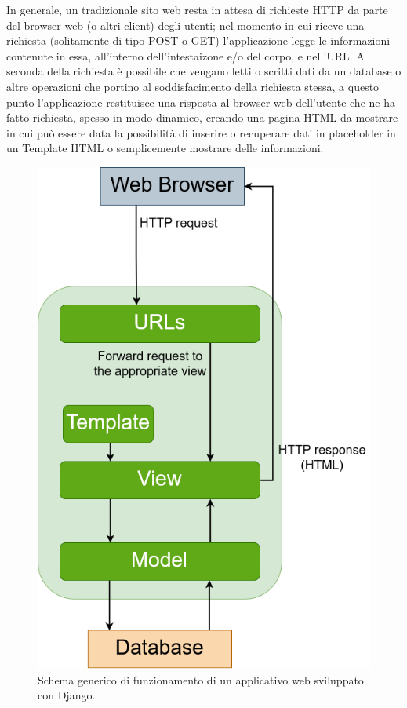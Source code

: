 In generale, un tradizionale sito web resta in attesa di richieste HTTP da parte del browser web (o altri client) degli utenti; nel momento in cui riceve 
una richiesta (solitamente di tipo POST o GET) 
l'applicazione legge le informazioni contenute in essa, all'interno dell'intestaizone e/o del corpo, e nell'URL. A seconda della richiesta è possibile che 
vengano letti o scritti dati da un database o altre operazioni che portino al soddisfacimento della richiesta stessa, a questo punto l'applicazione restituisce una 
risposta al browser web dell'utente che ne ha fatto richiesta, spesso in modo dinamico, creando una pagina HTML da mostrare in cui può essere data 
la possibilità di inserire o recuperare dati in placeholder in un Template HTML o semplicemente mostrare delle informazioni.
%
\newpage
%
\begin{figure}[ht!]
    \centering
    \includegraphics[scale=0.3]{images/Django_doc.png}
    \caption{Schema generico di funzionamento di un applicativo web sviluppato con Django.}
    \label{fig:django_doc}
\end{figure}
